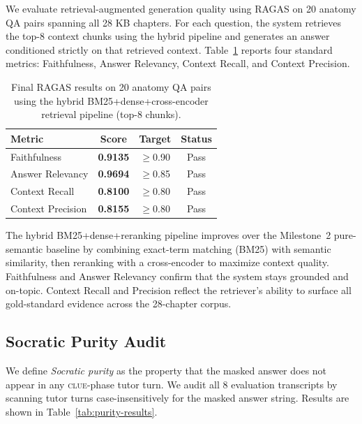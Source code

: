 \documentclass[11pt]{article}
\begin{document}
We evaluate retrieval-augmented generation quality using RAGAS
\citep{es2024ragas} on 20 anatomy QA pairs spanning all 28 KB chapters.
For each question, the system retrieves the top-8 context chunks using the
hybrid pipeline and generates an answer conditioned strictly on that
retrieved context.
Table~\ref{tab:ragas-results} reports four standard metrics: Faithfulness,
Answer Relevancy, Context Recall, and Context Precision.

\begin{table}[t]
\centering\small
\begin{tabularx}{\columnwidth}{@{}l c c c@{}}
\toprule
\textbf{Metric} & \textbf{Score} & \textbf{Target} & \textbf{Status} \\
\midrule
Faithfulness      & \textbf{0.9135} & $\geq$0.90 & \textcolor{green!60!black}{Pass} \\
Answer Relevancy  & \textbf{0.9694} & $\geq$0.85 & \textcolor{green!60!black}{Pass} \\
Context Recall    & \textbf{0.8100} & $\geq$0.80 & \textcolor{green!60!black}{Pass} \\
Context Precision & \textbf{0.8155} & $\geq$0.80 & \textcolor{green!60!black}{Pass} \\
\bottomrule
\end{tabularx}
\caption{Final RAGAS results on 20 anatomy QA pairs using the hybrid
BM25+dense+cross-encoder retrieval pipeline (top-8 chunks).}
\label{tab:ragas-results}
\end{table}

The hybrid BM25+dense+reranking pipeline improves over the Milestone~2
pure-semantic baseline by combining exact-term matching (BM25) with
semantic similarity, then reranking with a cross-encoder to maximize
context quality.
Faithfulness and Answer Relevancy confirm that the system stays grounded
and on-topic.
Context Recall and Precision reflect the retriever's ability to surface
all gold-standard evidence across the 28-chapter corpus.

\subsection{Socratic Purity Audit}

We define \emph{Socratic purity} as the property that the masked answer
does not appear in any \textsc{clue}-phase tutor turn.
We audit all 8 evaluation transcripts by scanning tutor turns
case-insensitively for the masked answer string.
Results are shown in Table~\ref{tab:purity-results}.
\end{document}
